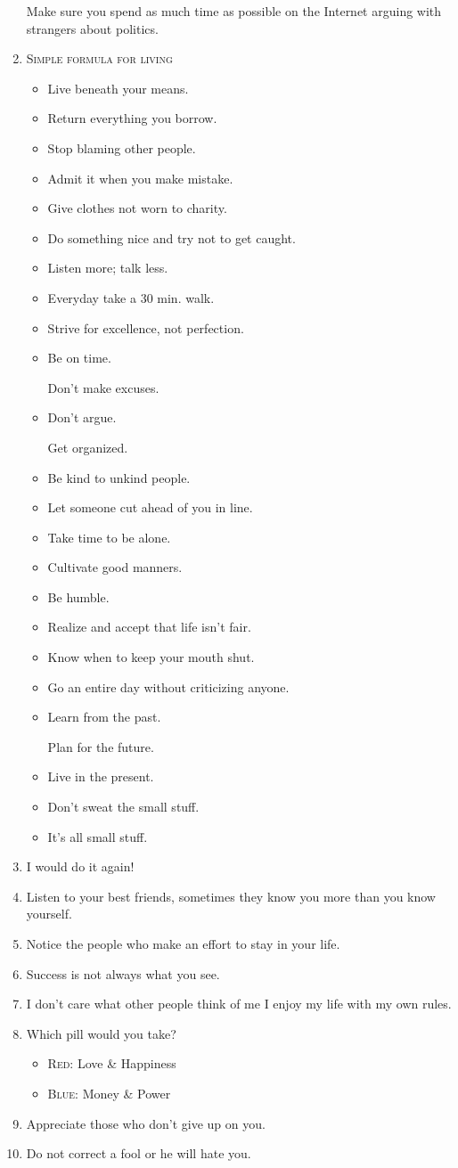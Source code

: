 \documentclass{article}
\begin{document}
\begin{enumerate}
	Make sure you spend as much time as possible on the Internet arguing with strangers about politics.
	\item \textsc{Simple formula for living}
	\begin{itemize}
		\item Live beneath your means.
		\item Return everything you borrow.
		\item Stop blaming other people.
		\item Admit it when you make mistake.
		\item Give clothes not worn to charity.
		\item Do something nice and try not to get caught.
		\item Listen more; talk less.
		\item Everyday take a 30 min. walk.
		\item Strive for excellence, not perfection.
		\item Be on time.
		
		Don't make excuses.
		\item Don't argue.
		
		Get organized.
		\item Be kind to unkind people.
		\item Let someone cut ahead of you in line.
		\item Take time to be alone.
		\item Cultivate good manners.
		\item Be humble.
		\item Realize and accept that life isn't fair.
		\item Know when to keep your mouth shut.
		\item Go an entire day without criticizing anyone.
		\item Learn from the past.
		
		Plan for the future.
		\item Live in the present.
		\item Don't sweat the small stuff.
		\item It's all small stuff.
	\end{itemize}
	\item I would do it again!
	\item Listen to your best friends, sometimes they know you more than you know yourself.
	\item Notice the people who make an effort to stay in your life.
	\item Success is not always what you see.
	\item I don't care what other people think of me I enjoy my life with my own rules.
	\item Which pill would you take?
	\begin{itemize}
		\item \textsc{Red}: Love \& Happiness
		\item \textsc{Blue}: Money \& Power
	\end{itemize}
	\item Appreciate those who don't give up on you.
	\item Do not correct a fool or he will hate you.
	

\end{enumerate}
\end{document}
